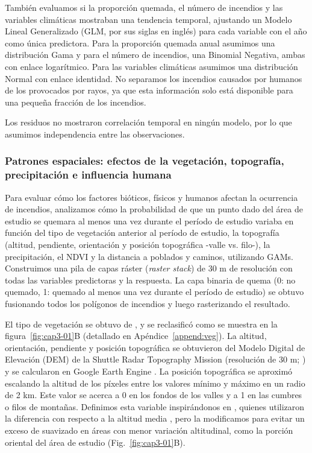 También evaluamos si la proporción quemada, el número de incendios y las variables climáticas mostraban una tendencia temporal, ajustando un Modelo Lineal Generalizado (GLM, por sus siglas en inglés) para cada variable con el año como única predictora. Para la proporción quemada anual asumimos una distribución Gama y para el número de incendios, una Binomial Negativa, ambas con enlace logarítmico. Para las variables climáticas asumimos una distribución Normal con enlace identidad. No separamos los incendios causados por humanos de los provocados por rayos, ya que esta información solo está disponible para una pequeña fracción de los incendios.

Los residuos no mostraron correlación temporal en ningún modelo, por lo que asumimos independencia entre las observaciones.

\subsubsection{Patrones espaciales: efectos de la vegetación, topografía, precipitación e influencia humana}\label{cap3:spat-analyses}

Para evaluar cómo los factores bióticos, físicos y humanos afectan la ocurrencia de incendios, analizamos cómo la probabilidad de que un punto dado del área de estudio se quemara al menos una vez durante el período de estudio variaba en función del tipo de vegetación anterior al período de estudio, la topografía (altitud, pendiente, orientación y posición topográfica -valle vs. filo-), la precipitación, el NDVI y la distancia a poblados y caminos, utilizando GAMs. Construimos una pila de capas ráster (\textit{raster stack}) de 30 m de resolución con todas las variables predictoras y la respuesta. La capa binaria de quema (0: no quemado, 1: quemado al menos una vez durante el período de estudio) se obtuvo fusionando todos los polígonos de incendios y luego rasterizando el resultado.

El tipo de vegetación se obtuvo de \citet{lara_vegetacion_1999}, y se reclasificó como se muestra en la figura~\ref{fig:cap3-01}B (detallado en Apéndice~\ref{append:veg}). La altitud, orientación, pendiente y posición topográfica se obtuvieron del Modelo Digital de Elevación (DEM) de la Shuttle Radar Topography Mission (resolución de 30 m; \citealt{farr_shuttle_2007}) y se calcularon en Google Earth Engine \citep{gorelick_google_2017}. La posición topográfica se aproximó escalando la altitud de los píxeles entre los valores mínimo y máximo en un radio de 2 km. Este valor se acerca a 0 en los fondos de los valles y a 1 en las cumbres o filos de montañas. Definimos esta variable inspirándonos en \citet{holsinger_weather_2016}, quienes utilizaron la diferencia con respecto a la altitud media \citep{gallant2000}, pero la modificamos para evitar un exceso de suavizado en áreas con menor variación altitudinal, como la porción oriental del área de estudio (Fig.~\ref{fig:cap3-01}B).


